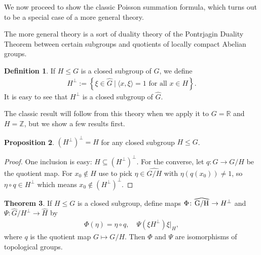 \documentclass[10pt,twoside,openany,final]{memoir}
\newcommand\reallywidehat[1]{%
\savestack{\tmpbox}{\stretchto{%
  \scaleto{%
    \scalerel*[\widthof{\ensuremath{#1}}]{\kern-.6pt\bigwedge\kern-.6pt}%
    {\rule[-\textheight/2]{1ex}{\textheight}}%
  }{\textheight}%
}{0.5ex}}%
\stackon[1pt]{#1}{\tmpbox}%
}
\theoremstyle{definition}
\newtheorem{theorem}{Theorem}[chapter]
\newtheorem{proposition}[theorem]{Proposition}
\newtheorem{definition}[theorem]{Definition}
\theoremstyle{Break}
\newcommand{\R}{\mathbb{R}}
\newcommand{\Z}{\mathbb{Z}}
\newcommand{\G}{\widehat{G}}
\begin{document}
We now proceed to show the classic Poisson summation formula, which turns out to be a special case of a more general theory.

The more general theory is a sort of duality theory of the Pontrjagin Duality Theorem between certain subgroups and quotients of locally compact Abelian groups. 
\begin{definition}
	If $H\leq G$ is a closed subgroup of $G$, we define
	\begin{align*}
		H^\perp := \left\{ \xi \in \G \ \big| \ \langle x, \xi \rangle = 1 \text{ for all } x \in H \right\}.
	\end{align*}
	It is easy to see that $H^\perp$ is a closed subgroup of $\G$.
\end{definition}
The classic result will follow from this theory when we apply it to $G=\R$ and $H=\Z$, but we show a few results first.
\begin{proposition}
	$(H^\perp)^\perp=H$ for any closed subgroup $H \leq G$.
	\label{4.38}
\end{proposition}
\begin{proof}
	One inclusion is easy: $H \subseteq (H^\perp)^\perp$. For the converse, let $q \colon G \to G/H$ be the quotient map. For $x_0 \not \in H$ use  to pick $\eta \in \widehat{G/H}$ with $\eta(q(x_0))\neq 1$, so $\eta \circ q \in H^\perp$ which means $x_0 \not \in (H^\perp)^\perp$.
\end{proof}
\begin{theorem}
	If $H \leq G$ is a closed subgroup, define maps $\Phi \colon \reallywidehat{G/H} \to H^\perp$ and $\Psi \colon \G/H^\perp \to \widehat H$ by
	\begin{align*}
	\Phi(\eta)=\eta \circ q, \quad \Psi(\xi H^\perp) \xi|_H,
	\end{align*}
	where $q$ is the quotient map $G \mapsto G/H$. Then $\Phi$ and $\Psi$ are isomorphisms of topological groups.
	\label{4.39}
\end{theorem}
\end{document}
